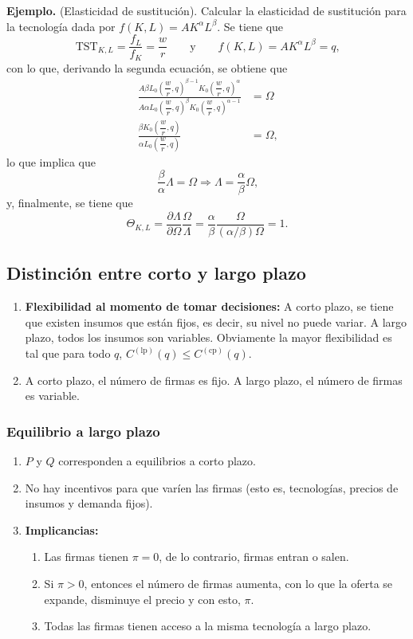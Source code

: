 \documentclass{report}
\renewcommand{\a}{\alpha}
\renewcommand{\b}{\beta}
\newenvironment{example}[1]{\noindent\setlength{\parskip}{0pt}\textbf{Ejemplo.} (#1).}{}
\begin{document}
\newpage

\begin{example}{Elasticidad de sustitución}
Calcular la elasticidad de sustitución para la tecnología dada por $f\!\left(K,L\right)=AK^\a L^\b$. Se tiene que
\[
\mathrm{TST}_{K,L}=\frac{f_L}{f_K}=\frac{w}{r}\qquad\text{y}\qquad f\!\left(K,L\right)=AK^\a L^\b=q\text{,}
\]
con lo que, derivando la segunda ecuación, se obtiene que
\begin{align*}
\frac{A\b L_0\!\left(\dfrac{w}{r},q\right)^{\b-1}K_0\!\left(\dfrac{w}{r},q\right)^\a}{A\a L_0\!\left(\dfrac{w}{r},q\right)^\b K_0\!\left(\dfrac{w}{r},q\right)^{\a-1}}& = \Omega \\
\frac{\b K_0\!\left(\dfrac{w}{r},q\right)}{\a L_0\!\left(\dfrac{w}{r},q\right)} & = \Omega\text{,}
\end{align*}
lo que implica que
\[
\frac{\b}{\a}\Lambda=\Omega\Rightarrow\Lambda=\frac{\a}{\b}\Omega\text{,}
\]
y, finalmente, se tiene que
\[
\Theta_{K,L}=\frac{\partial\Lambda}{\partial\Omega}\frac{\Omega}{\Lambda}=\frac{\a}{\b}\frac{\Omega}{\left(\a/\b\right)\Omega}=1\text{.}
\]
\end{example}

\subsection{Distinción entre corto y largo plazo}

\begin{enumerate}
\item \textbf{Flexibilidad al momento de tomar decisiones:} A corto plazo, se tiene que existen insumos que están fijos, es decir, su nivel no puede variar. A largo plazo, todos los insumos son variables. Obviamente la mayor flexibilidad es tal que para todo $q$, $C^{\left(\text{lp}\right)}\!\left(q\right)\le C^{\left(\text{cp}\right)}\!\left(q\right)$.
\item A corto plazo, el número de firmas es fijo. A largo plazo, el número de firmas es variable.
\end{enumerate}

\subsubsection{Equilibrio a largo plazo}

\begin{enumerate}
\item $P$ y $Q$ corresponden a equilibrios a corto plazo.
\item No hay incentivos para que varíen las firmas (esto es, tecnologías, precios de insumos y demanda fijos).
\item \textbf{Implicancias:}
\begin{enumerate}
\item Las firmas tienen $\pi=0$, de lo contrario, firmas entran o salen.
\item Si $\pi>0$, entonces el número de firmas aumenta, con lo que la oferta se expande, disminuye el precio y con esto, $\pi$.
\item Todas las firmas tienen acceso a la misma tecnología a largo plazo.
\end{enumerate}
\end{enumerate}
\end{document}

